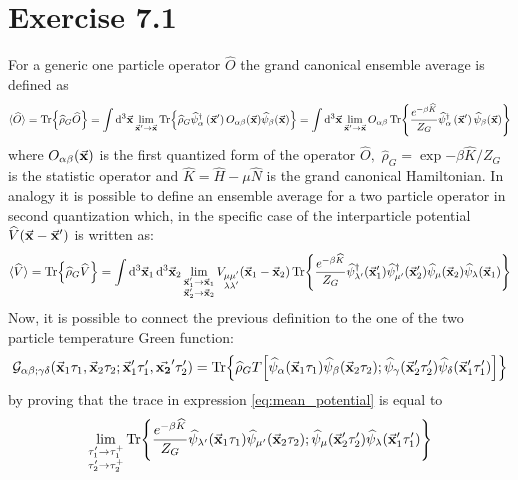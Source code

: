 \documentclass[a4paper]{article}
\newcommand{\meanv}[1]{\langle #1 \rangle}
\renewcommand{\hat}{\widehat}
\begin{document}
\section*{Exercise 7.1}
For a generic one particle operator $\hat{O}$ the grand canonical ensemble average is defined as
\begin{equation}
\meanv{\hat{O}} = \Tr{\hat{\rho}_G \hat{O}} = \int \dd[3]{\va{x}} \lim_{\va{x}'\rightarrow\va{x}}\Tr{\widehat{\rho}_{G} \hat{\psi}_{\alpha}^{\dagger}\left(\va{x}^{\prime}\right) O_{\alpha \beta}(\va{x}) \hat{\psi}_{\beta}(\va{x})}
= \int \dd[3]{\va{x}} \lim_{\va{x}'\rightarrow\va{x}} O_{\alpha\beta}\Tr{\frac{e^{-\beta\hat{K}}}{Z_G}\hat{\psi}_{\alpha}^{\dagger}\left(\va{x}^{\prime}\right)  \hat{\psi}_{\beta}(\va{x}) }
\end{equation}
where $O_{\alpha\beta}(\va{x})$ is the first quantized form of the operator $\hat{O},$ $\hat{\rho}_G = \exp{-\beta\hat{K}}/Z_G$ is the statistic operator and $\hat{K} = \hat{H} - \mu\hat{N}$ is the grand canonical Hamiltonian.
In analogy it is possible to define an ensemble average for a two particle operator in second quantization which, in the specific case of the interparticle potential $\hat{V}(\va{x} - \va{x}')$ is written as:
\begin{equation}
\meanv{\hat{V}} = \Tr{\hat{\rho}_G\hat{V}} = \int\dd[3]{\va{x}_1}\dd[3]{\va{x}_2} \lim_{\substack{\va{x}_1'\rightarrow\va{x}_1\\\va{x}_2'\rightarrow\va{x}_2}} 
V_{\substack{\mu\mu'\\\lambda\lambda'}}(\va{x}_1 - \va{x}_2)\Tr{\frac{e^{-\beta\hat{K}}}{Z_G}\hat{\psi}^\dag_{\lambda'}(\va{x}_1')\hat{\psi}^\dag_{\mu'}(\va{x}_2')\hat{\psi}_\mu(\va{x}_2)\hat{\psi}_\lambda(\va{x}_1)}
\label{eq:mean_potential}
\end{equation}
Now, it is possible to connect the previous definition to the one of the two particle temperature Green function:
\begin{equation}
\mathcal{G}_{\alpha\beta;\gamma\delta}(\va{x}_1\tau_1,\va{x}_2\tau_2;\va{x}_1'\tau_1',\va{x_2}'\tau_2')
= \Tr{\hat{\rho}_G T\bqty{\hat{\psi}_\alpha(\va{x}_1\tau_1) \hat{\psi}_\beta(\va{x}_2\tau_2);\hat{\psi}_\gamma(\va{x}_2'\tau_2') \hat{\psi}_\delta(\va{x}_1'\tau_1')}}
\label{eq:temp_GF}
\end{equation}
by proving that the trace in expression \eqref{eq:mean_potential} is equal to 
\begin{equation}
\lim_{\substack{\tau_1'\rightarrow\tau_1^+\\\tau_2'\rightarrow\tau_2^+}}
\Tr{\frac{e^{-\beta\hat{K}}}{Z_G}\hat{\psi}_{\lambda'}(\va{x}_1\tau_1) \hat{\psi}_{\mu'}(\va{x}_2\tau_2);\hat{\psi}_\mu(\va{x}_2'\tau_2') \hat{\psi}_\lambda(\va{x}_1'\tau_1')}
\end{equation}
\end{document}
